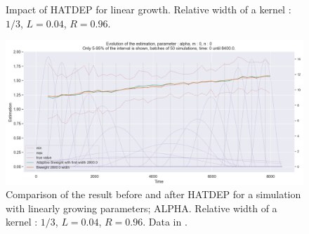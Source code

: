 \begin{figure}
\centering
{} 
\caption{Impact of HATDEP for linear growth. Relative width of a kernel : $1/3$, $L = 0.04$, $R = 0.96$.}
\label{fig:compar_kernels_1}
\end{figure}

\begin{figure}
\centering
\includegraphics[width = 0.90 \textwidth]{../imag/chap3/1/D.png}
\caption{Comparison of the result before and after HATDEP for a simulation with linearly growing parameters; ALPHA. Relative width of a kernel : $1/3$, $L = 0.04$, $R = 0.96$. Data in \protect {}.}
\label{fig:first_estimate_1_alpha}
\end{figure}


